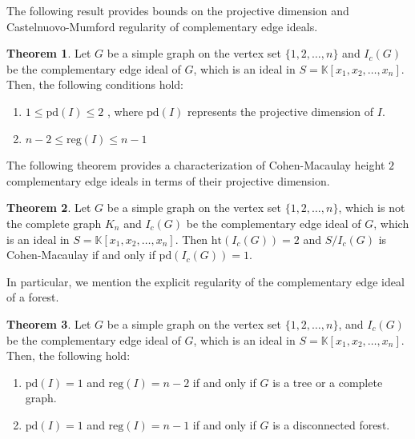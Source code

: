 \documentclass[oneside, 12pt]{amsart} \topmargin      -10mm \textwidth      160 true mm
\theoremstyle{definition}
\newtheorem{theorem'}{Theorem}[subsection]
\numberwithin{equation}{section}
\begin{document}
\noindent The following result provides bounds on the projective dimension and Castelnuovo-Mumford regularity of complementary edge ideals. 
\begin{theorem'}\cite[Proposition~4.1.]{hibi2025complementary}\label{bound on reg and pd}
Let $G$ be a simple graph on the vertex set $\{1,2,\dots,n\}$ and $I_c(G)$ be the complementary edge ideal of $G$, which is an ideal in $S=\mathbb{K}[x_1,x_2,\dots,x_n]$. Then, the following conditions hold:
\begin{enumerate}
    \item $1 \leq \mathrm{pd}(I) \leq 2$ , where $\mathrm{pd}(I)$ represents the projective dimension of $I$. 
    \item $n-2\leq \mathrm{reg}(I) \leq n-1$
\end{enumerate}
\end{theorem'}
The following theorem provides a characterization of Cohen-Macaulay height $2$ complementary edge ideals in terms of their projective dimension. 
\begin{theorem'}\cite[Theorem~1.1.]{hibi2025complementary} \label{pd lem}
Let $G$ be a simple graph on the vertex set $\{1,2,\dots,n\}$, which is not the complete graph $K_n$ and $I_c(G)$ be the complementary edge ideal of $G$, which is an ideal in $S=\mathbb{K}[x_1,x_2,\dots,x_n]$. Then $\mathrm{ht}(I_c(G))=2$ and $S/I_c(G)$ is Cohen-Macaulay if and only if $\mathrm{pd}(I_c(G))=1$.
\end{theorem'}
\noindent In particular, we mention the explicit regularity of the complementary edge ideal of a forest. 
\begin{theorem'}\cite[Theorem~4.2.]{hibi2025complementary}\label{char using reg and pd}
Let $G$ be a simple graph on the vertex set $\{1,2,\dots,n\}$, and $I_c(G)$ be the complementary edge ideal of $G$, which is an ideal in $S=\mathbb{K}[x_1,x_2,\dots,x_n]$. Then, the following hold:
\begin{enumerate}
    \item $\mathrm{pd}(I)=1$ and $\mathrm{reg}(I)=n-2$ if and only if $G$ is a tree or a complete graph.
    \item  $\mathrm{pd}(I)=1$ and $\mathrm{reg}(I)=n-1$ if and only if $G$ is a disconnected forest.
\end{enumerate}
\end{theorem'}
\end{document}
